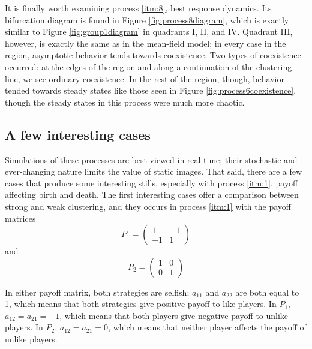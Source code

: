 \documentclass[notitlepage,reqno]{amsart}
\begin{document}
It is finally worth examining process \ref{itm:8}, best response
dynamics. Its bifurcation diagram is found in Figure
\ref{fig:process8diagram}, which is exactly similar to Figure
\ref{fig:group1diagram} in quadrants I, II, and IV. Quadrant III,
however, is exactly the same as in the mean-field model; in every case
in the region, asymptotic behavior tends towards coexistence. Two
types of coexistence occurred: at the edges of the region and along a
continuation of the clustering line, we see ordinary coexistence. In
the rest of the region, though, behavior tended towards steady states
like those seen in Figure \ref{fig:process6coexistence}, though the
steady states in this process were much more chaotic.

\subsection{A few interesting cases}
Simulations of these processes are best viewed in real-time; their
stochastic and ever-changing nature limits the value of static
images. That said, there are a few cases that produce some interesting
stills, especially with process \ref{itm:1}, payoff affecting birth
and death. The first interesting cases offer a comparison between strong and weak
clustering, and they occurs in process \ref{itm:1} with the payoff
matrices
\[
    P_1 = \begin{pmatrix}
      1 & -1 \\
      -1 & 1
    \end{pmatrix}
\]
and
\[
    P_2 = \begin{pmatrix}
     1 & 0 \\
     0 & 1
   \end{pmatrix}
\]

In either payoff matrix, both strategies are selfish; $a_{11}$ and
$a_{22}$ are both equal to 1, which means that both strategies give
positive payoff to like players. In $P_1$, $a_{12} = a_{21} = -1$, which means that both players give negative payoff to
unlike players. In $P_2$, $a_{12} = a_{21} = 0$, which means that neither player affects the payoff of unlike players.
\end{document}
